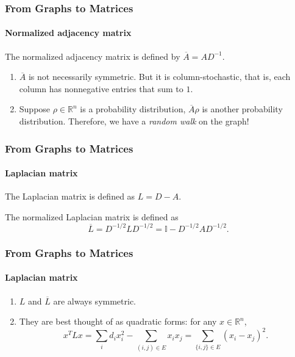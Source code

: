 \documentclass[aspectratio=43,leqno]{beamer}
\begin{document}
\begin{frame}
  \frametitle{From Graphs to Matrices}
  \framesubtitle{Normalized adjacency matrix}
\begin{definition}
  The normalized adjacency matrix is defined by $\overline{A} = AD^{-1}$.
\end{definition}
\pause

\begin{enumerate}
\item\label{item:19} $\overline{A}$ is not necessarily symmetric. But it is column-stochastic, that is, each column has nonnegative entries that sum to $1$. \pause
\item\label{item:21} Suppose $\rho \in \mathbb{R}^n$ is a probability distribution, $\overline{A}\rho$ is another probability distribution. Therefore, we have a \emph{random walk} on the graph!
\end{enumerate}

\end{frame}

\begin{frame}
  \frametitle{From Graphs to Matrices}
  \framesubtitle{Laplacian matrix}
  
\begin{definition}
  The Laplacian matrix is defined as $L = D - A$.
\end{definition}
\pause

\begin{definition}
  The normalized Laplacian matrix is defined as 
\begin{displaymath}
\overline{L} = D^{-1/2}LD^{-1/2} = \mathbb{I} - D^{-1/2}AD^{-1/2}.
\end{displaymath}
\end{definition}
\end{frame}

\begin{frame}
  \frametitle{From Graphs to Matrices}
  \framesubtitle{Laplacian matrix}
  
\begin{enumerate}
\item\label{item:22} $L$ and $\overline{L}$ are always symmetric. \pause
\item\label{item:23} They are best thought of as quadratic forms: for any $x\in \mathbb{R}^n$, 
\begin{displaymath}
x^T L x = \sum_i d_ix_i^2 - \sum_{(i,j)\in E} x_ix_j = \sum_{\{i,j\}\in E} (x_i-x_j)^2.
\end{displaymath}
\end{enumerate}

\end{frame}
\end{document}
